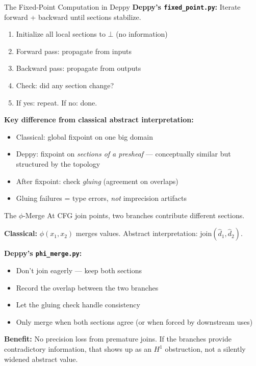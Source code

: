 \documentclass[aspectratio=169,10pt]{beamer}
\begin{document}
\begin{frame}{The Fixed-Point Computation in Deppy}
\textbf{Deppy's \texttt{fixed\_point.py}:} Iterate forward + backward until sections stabilize.

\begin{enumerate}
  \item Initialize all local sections to $\bot$ (no information)
  \item Forward pass: propagate from inputs
  \item Backward pass: propagate from outputs
  \item Check: did any section change?
  \item If yes: repeat. If no: done.
\end{enumerate}

\textbf{Key difference from classical abstract interpretation:}
\begin{itemize}
  \item Classical: global fixpoint on one big domain
  \item Deppy: fixpoint on \emph{sections of a presheaf} --- conceptually similar but structured by the topology
  \item After fixpoint: check \emph{gluing} (agreement on overlaps)
  \item Gluing failures = type errors, \emph{not} imprecision artifacts
\end{itemize}
\end{frame}

\begin{frame}{The $\phi$-Merge}
At CFG join points, two branches contribute different sections.

\textbf{Classical:} $\phi(x_1, x_2)$ merges values. Abstract interpretation: $\text{join}(\hat{d}_1, \hat{d}_2)$.

\textbf{Deppy's \texttt{phi\_merge.py}:}
\begin{itemize}
  \item Don't join eagerly --- keep both sections
  \item Record the overlap between the two branches
  \item Let the gluing check handle consistency
  \item Only merge when both sections agree (or when forced by downstream uses)
\end{itemize}

\vspace{0.3em}
\textbf{Benefit:} No precision loss from premature joins. If the branches provide contradictory information, that shows up as an $H^1$ obstruction, not a silently widened abstract value.
\end{frame}
\end{document}
